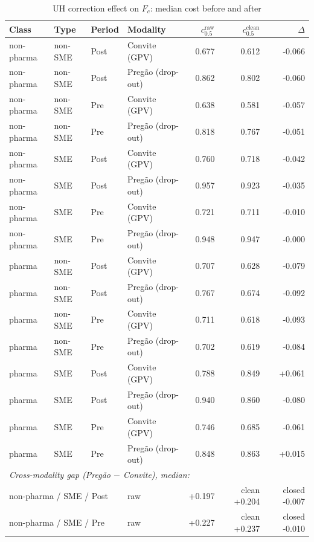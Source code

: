 \begin{table}[htbp]
\centering
\begin{threeparttable}
\caption{UH correction effect on $F_c$: median cost before and after}
\label{tab:v3_uh_vs_raw}
\footnotesize
\setlength{\tabcolsep}{4pt}
\begin{tabular}{llllrrr}
\toprule
Class & Type & Period & Modality & $c_{0.5}^{\text{raw}}$ & $c_{0.5}^{\text{clean}}$ & $\Delta$ \\
\midrule
non-pharma & non-SME & Post & Convite (GPV) & 0.677 & 0.612 & -0.066 \\
non-pharma & non-SME & Post & Pregão (drop-out) & 0.862 & 0.802 & -0.060 \\
non-pharma & non-SME & Pre & Convite (GPV) & 0.638 & 0.581 & -0.057 \\
non-pharma & non-SME & Pre & Pregão (drop-out) & 0.818 & 0.767 & -0.051 \\
non-pharma & SME & Post & Convite (GPV) & 0.760 & 0.718 & -0.042 \\
non-pharma & SME & Post & Pregão (drop-out) & 0.957 & 0.923 & -0.035 \\
non-pharma & SME & Pre & Convite (GPV) & 0.721 & 0.711 & -0.010 \\
non-pharma & SME & Pre & Pregão (drop-out) & 0.948 & 0.947 & -0.000 \\
pharma & non-SME & Post & Convite (GPV) & 0.707 & 0.628 & -0.079 \\
pharma & non-SME & Post & Pregão (drop-out) & 0.767 & 0.674 & -0.092 \\
pharma & non-SME & Pre & Convite (GPV) & 0.711 & 0.618 & -0.093 \\
pharma & non-SME & Pre & Pregão (drop-out) & 0.702 & 0.619 & -0.084 \\
pharma & SME & Post & Convite (GPV) & 0.788 & 0.849 & +0.061 \\
pharma & SME & Post & Pregão (drop-out) & 0.940 & 0.860 & -0.080 \\
pharma & SME & Pre & Convite (GPV) & 0.746 & 0.685 & -0.061 \\
pharma & SME & Pre & Pregão (drop-out) & 0.848 & 0.863 & +0.015 \\
\midrule
\multicolumn{7}{l}{\textit{Cross-modality gap (Preg\~ao $-$ Convite), median:}} \\
\multicolumn{3}{l}{non-pharma / SME / Post} & raw & +0.197 & clean +0.204 & closed -0.007 \\
\multicolumn{3}{l}{non-pharma / SME / Pre} & raw & +0.227 & clean +0.237 & closed -0.010 \\

\end{tabular}
\end{threeparttable}
\end{table}
